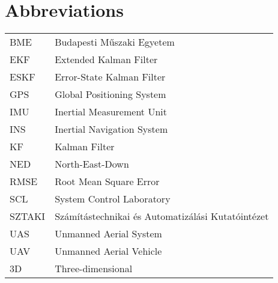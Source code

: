 \chapter*{Abbreviations}

\renewcommand*{\arraystretch}{1}
\begin{longtable}{l l}
    BME & Budapesti Műszaki Egyetem \\ 
    EKF & Extended Kalman Filter \\
    ESKF & Error-State Kalman Filter \\
    GPS & Global Positioning System \\
    IMU & Inertial Measurement Unit \\
    INS & Inertial Navigation System \\
    KF & Kalman Filter \\
    NED & North-East-Down \\
    RMSE & Root Mean Square Error \\
    SCL & System Control Laboratory \\
    SZTAKI & Számítástechnikai és Automatizálási Kutatóintézet \\
    UAS & Unmanned Aerial System \\
    UAV & Unmanned Aerial Vehicle \\
    3D & Three-dimensional 
\end{longtable}